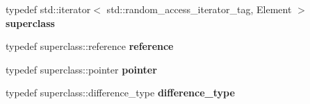 \begin{DoxyCompactItemize}
typedef std\+::iterator$<$ std\+::random\+\_\+access\+\_\+iterator\+\_\+tag, Element $>$ {\bfseries superclass}
\item 
\mbox{\label{classgoogle_1_1protobuf_1_1internal_1_1RepeatedPtrIterator_acbb8d7e32d1d385d32ba3fbc417746b3}} 
typedef superclass\+::reference {\bfseries reference}
\item 
\mbox{\label{classgoogle_1_1protobuf_1_1internal_1_1RepeatedPtrIterator_a95c80fe631fa6cc3314e0551a729ab26}} 
typedef superclass\+::pointer {\bfseries pointer}
\item 
\mbox{\label{classgoogle_1_1protobuf_1_1internal_1_1RepeatedPtrIterator_adeff8e942f0b76e7effa0c2c96bdbd2c}} 
typedef superclass\+::difference\+\_\+type {\bfseries difference\+\_\+type}
\end{DoxyCompactItemize}
